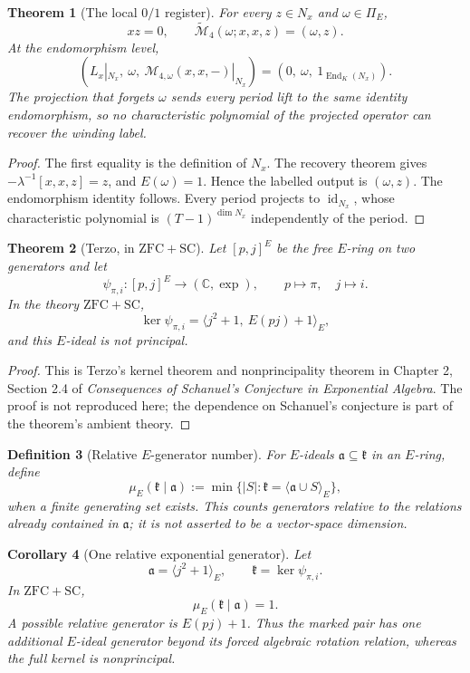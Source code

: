 \documentclass[11pt]{article}
\newtheorem{definition}{Definition}
\newtheorem{theorem}[definition]{Theorem}
\newtheorem{corollary}[definition]{Corollary}
\newcommand{\C}{\mathbb C}
\newcommand{\End}{\operatorname{End}}
\newcommand{\id}{\operatorname{id}}
\begin{document}
\begin{theorem}[The local $0/1$ register]
For every $z\in N_x$ and $\omega\in\Pi_E$,
\[
xz=0,
\qquad
\widetilde{\mathcal M}_4(\omega;x,x,z)=(\omega,z).
\]
At the endomorphism level,
\[
\left(L_x|_{N_x},\ \omega,\ \mathcal M_{4,\omega}(x,x,-)|_{N_x}\right)
=
\left(0,\ \omega,\ 1_{\End_K(N_x)}\right).
\]
The projection that forgets $\omega$ sends every period lift to the same identity endomorphism, so no characteristic polynomial of the projected operator can recover the winding label.
\end{theorem}

\begin{proof}
The first equality is the definition of $N_x$.  The recovery theorem gives $-\lambda^{-1}[x,x,z]=z$, and $E(\omega)=1$.  Hence the labelled output is $(\omega,z)$.  The endomorphism identity follows.  Every period projects to $\id_{N_x}$, whose characteristic polynomial is $(T-1)^{\dim N_x}$ independently of the period.
\end{proof}

\begin{theorem}[Terzo, in $\mathrm{ZFC}+\mathrm{SC}$]
Let $[p,j]^E$ be the free $E$-ring on two generators and let
\[
\psi_{\pi,i}:[p,j]^E\to(\C,\exp),\qquad p\mapsto\pi,\quad j\mapsto i.
\]
In the theory $\mathrm{ZFC}+\mathrm{SC}$,
\[
\ker\psi_{\pi,i}=\langle j^2+1,\ E(pj)+1\rangle_E,
\]
and this $E$-ideal is not principal.
\end{theorem}

\begin{proof}
This is Terzo's kernel theorem and nonprincipality theorem in Chapter 2, Section 2.4 of \emph{Consequences of Schanuel's Conjecture in Exponential Algebra}.  The proof is not reproduced here; the dependence on Schanuel's conjecture is part of the theorem's ambient theory.
\end{proof}

\begin{definition}[Relative $E$-generator number]
For $E$-ideals $\mathfrak a\subseteq\mathfrak k$ in an $E$-ring, define
\[
\mu_E(\mathfrak k\mid\mathfrak a)
:=
\min\bigl\{|S|:\mathfrak k=\langle\mathfrak a\cup S\rangle_E\bigr\},
\]
when a finite generating set exists.  This counts generators relative to the relations already contained in $\mathfrak a$; it is not asserted to be a vector-space dimension.
\end{definition}

\begin{corollary}[One relative exponential generator]
Let
\[
\mathfrak a=\langle j^2+1\rangle_E,
\qquad
\mathfrak k=\ker\psi_{\pi,i}.
\]
In $\mathrm{ZFC}+\mathrm{SC}$,
\[
\mu_E(\mathfrak k\mid\mathfrak a)=1.
\]
A possible relative generator is $E(pj)+1$.  Thus the marked pair has one additional $E$-ideal generator beyond its forced algebraic rotation relation, whereas the full kernel is nonprincipal.
\end{corollary}
\end{document}
